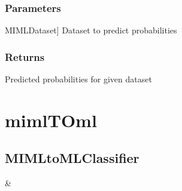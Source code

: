 \documentclass[letterpaper,10pt,english]{sphinxmanual}
\begin{document}
\begin{fulllineitems}
\begin{fulllineitems}
\subsubsection{Parameters}
\label{\detokenize{classifier/_autosummary/miml.classifier.miml_classifier.MIMLClassifier:id6}}\begin{description}
\sphinxlineitem{dataset\_test}{[}MIMLDataset{]}
\sphinxAtStartPar
Dataset to predict probabilities

\end{description}


\subsubsection{Returns}
\label{\detokenize{classifier/_autosummary/miml.classifier.miml_classifier.MIMLClassifier:id7}}\begin{description}
\sphinxAtStartPar
Predicted probabilities for given dataset

\end{description}

\end{fulllineitems}


\end{fulllineitems}


\sphinxstepscope


\section{mimlTOml}
\label{\detokenize{classifier/mimlTOml/index:mimltoml}}\label{\detokenize{classifier/mimlTOml/index::doc}}
\sphinxstepscope


\subsection{MIMLtoMLClassifier}
\label{\detokenize{classifier/mimlTOml/miml_to_ml_classifier:mimltomlclassifier}}\label{\detokenize{classifier/mimlTOml/miml_to_ml_classifier::doc}}

\begin{savenotes}\sphinxattablestart
\sphinxthistablewithglobalstyle
\sphinxthistablewithnovlinesstyle
\centering
\begin{tabulary}{\linewidth}[t]{}
\sphinxtoprule
\sphinxtableatstartofbodyhook
\sphinxAtStartPar
{\hyperref[\detokenize{classifier/mimlTOml/_autosummary/miml.classifier.mimlTOml.miml_to_ml_classifier.MIMLtoMLClassifier:miml.classifier.mimlTOml.miml_to_ml_classifier.MIMLtoMLClassifier}]{}}
&
\sphinxAtStartPar

\\
\sphinxbottomrule
\end{tabulary}
\sphinxtableafterendhook\par
\sphinxattableend\end{savenotes}
\end{document}
